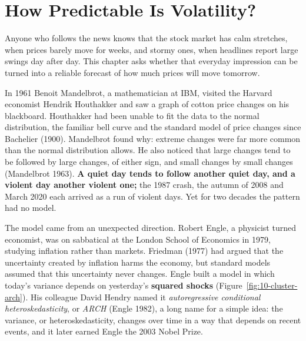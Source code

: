 \makeatletter
{}
\makeatother

\chapter{How Predictable Is Volatility?}
\label{ch:07}
\providecommand{\term}[1]{\emph{#1}}

Anyone who follows the news knows that the stock market has calm stretches, when prices barely move for weeks, and stormy ones, when headlines report large swings day after day. This chapter asks whether that everyday impression can be turned into a reliable forecast of how much prices will move tomorrow.

In 1961 Benoit Mandelbrot, a mathematician at IBM, visited the Harvard economist Hendrik Houthakker and saw a graph of cotton price changes on his blackboard. Houthakker had been unable to fit the data to the normal distribution, the familiar bell curve and the standard model of price changes since Bachelier (1900). Mandelbrot found why: extreme changes were far more common than the normal distribution allows. He also noticed that large changes tend to be followed by large changes, of either sign, and small changes by small changes (Mandelbrot 1963). \textbf{A quiet day tends to follow another quiet day, and a violent day another violent one;} the 1987 crash, the autumn of 2008 and March 2020 each arrived as a run of violent days. Yet for two decades the pattern had no model.

The model came from an unexpected direction. Robert Engle, a physicist turned economist, was on sabbatical at the London School of Economics in 1979, studying inflation rather than markets. Friedman (1977) had argued that the uncertainty created by inflation harms the economy, but standard models assumed that this uncertainty never changes. Engle built a model in which today's variance depends on yesterday's \textbf{squared shocks} (Figure~\ref{fig:10-cluster-arch}). His colleague David Hendry named it \term{autoregressive conditional heteroskedasticity}, or \term{ARCH} (Engle 1982), a long name for a simple idea: the variance, or heteroskedasticity, changes over time in a way that depends on recent events, and it later earned Engle the 2003 Nobel Prize.


